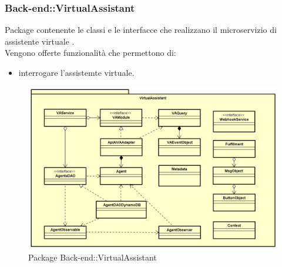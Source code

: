 \subsubsection{Back-end::VirtualAssistant}
Package contenente le classi e le interfacce che realizzano il microservizio di assistente virtuale .\\
Vengono offerte funzionalità che permettono di:
\begin{itemize}
\item interrogare l'assistemte virtuale.
\end{itemize}
\begin{figure}[h] \centering \includegraphics[width=\textwidth,height=\textheight,keepaspectratio]{images/diagrams/back-end/Official_Backend_0304/VirtualAssistant.png}
	\caption{Package Back-end::VirtualAssistant}
\end{figure}
\newpage

